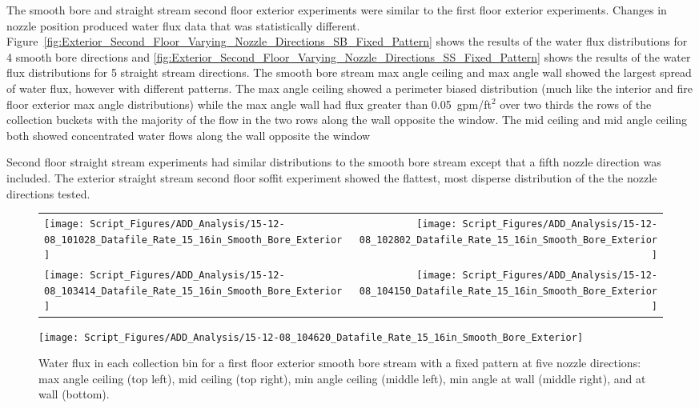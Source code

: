 \documentclass[12pt,oneside]{book}
\begin{document}
The smooth bore and straight stream second floor exterior experiments were similar to the first floor exterior experiments. Changes in nozzle position produced water flux data that was statistically different. Figure~\ref{fig:Exterior_Second_Floor_Varying_Nozzle_Directions_SB_Fixed_Pattern} shows the results of the water flux distributions for 4 smooth bore directions and \ref{fig:Exterior_Second_Floor_Varying_Nozzle_Directions_SS_Fixed_Pattern} shows the results of the water flux distributions for 5 straight stream directions. The smooth bore stream max angle ceiling and max angle wall showed the largest spread of water flux, however with different patterns. The max angle ceiling showed a perimeter biased distribution (much like the interior and fire floor exterior max angle distributions) while the max angle wall had flux greater than 0.05~gpm/ft$^2$ over two thirds the rows of the collection buckets with the majority of the flow in the two rows along the wall opposite the window. The mid ceiling and mid angle ceiling both showed concentrated water flows along the wall opposite the window

Second floor straight stream experiments had similar distributions to the smooth bore stream except that a fifth nozzle direction was included. The exterior straight stream second floor soffit experiment showed the flattest, most disperse distribution of the the nozzle directions tested.

\begin{figure}[ht]
\begin{tabular*}{\textwidth}{lr}
\texttt{[image: Script\_Figures/ADD\_Analysis/15-12-08\_101028\_Datafile\_Rate\_15\_16in\_Smooth\_Bore\_Exterior]} &
\texttt{[image: Script\_Figures/ADD\_Analysis/15-12-08\_102802\_Datafile\_Rate\_15\_16in\_Smooth\_Bore\_Exterior]} \\
\texttt{[image: Script\_Figures/ADD\_Analysis/15-12-08\_103414\_Datafile\_Rate\_15\_16in\_Smooth\_Bore\_Exterior]} &
\texttt{[image: Script\_Figures/ADD\_Analysis/15-12-08\_104150\_Datafile\_Rate\_15\_16in\_Smooth\_Bore\_Exterior]} \\
\end{tabular*}
\centering
\texttt{[image: Script\_Figures/ADD\_Analysis/15-12-08\_104620\_Datafile\_Rate\_15\_16in\_Smooth\_Bore\_Exterior]} \\
\caption[Water Flux for Varying Nozzle Direction with Fixed First Floor Exterior Smooth Bore Stream]{Water flux in each collection bin for a first floor exterior smooth bore stream with a fixed pattern at five nozzle directions: max angle ceiling (top left), mid ceiling (top right), min angle ceiling (middle left), min angle at wall (middle right), and at wall (bottom).}
\label{fig:Exterior_First_Floor_Varying_Nozzle_Directions_SB_Fixed_Pattern}
\end{figure}
\end{document}
